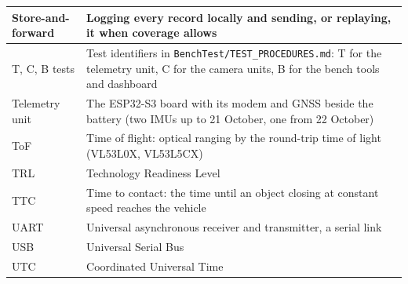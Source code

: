\documentclass[a4paper,11pt]{report}
\begin{document}
{{\begin{longtable}{|>{\raggedright\arraybackslash}p{2.6cm}|>{\raggedright\arraybackslash}p{11.2cm}|}
Store-and-forward & Logging every record locally and sending, or replaying, it when coverage allows \\ \hline
T, C, B tests & Test identifiers in \texttt{BenchTest/\allowbreak{}TEST\_\allowbreak{}PROCEDURES.md}: T for the telemetry unit, C for the camera units, B for the bench tools and dashboard \\ \hline
Telemetry unit & The ESP32-S3 board with its modem and GNSS beside the battery (two IMUs up to 21 October, one from 22 October) \\ \hline
ToF & Time of flight: optical ranging by the round-trip time of light (VL53L0X, VL53L5CX) \\ \hline
TRL & Technology Readiness Level \\ \hline
TTC & Time to contact: the time until an object closing at constant speed reaches the vehicle \\ \hline
UART & Universal asynchronous receiver and transmitter, a serial link \\ \hline
USB & Universal Serial Bus \\ \hline
UTC & Coordinated Universal Time \\ \hline
\end{longtable}
}

\newpage
\listoffigures

\newpage
\listoftables

\newpage
\fancyhead[RE,LO]{}
\fancyhead[LE]{\leftmark}
\fancyhead[RO]{\rightmark}
\pagestyle{fancy}











\appendix











}
\end{document}
